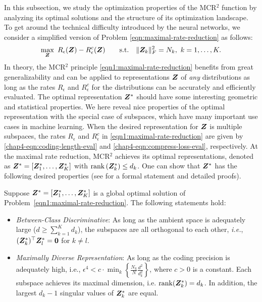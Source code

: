 \documentclass[../../book-main.tex]{subfiles}
\begin{document}
In this subsection, we study the optimization properties of the MCR$^2$ function by analyzing its optimal solutions and the structure of its optimization landscape. To get around the technical difficulty introduced by the neural networks, we consider a simplified version of Problem \eqref{eqn:maximal-rate-reduction} as follows: 
\begin{align}\label{eqn1:maximal-rate-reduction}
    \max_{\bm Z}\ R_{\epsilon}(\bm{Z}) - R_{\epsilon}^c(\bm{Z})\qquad \mathrm{s.t.}\quad \|\bm Z_k\|_F^2 = N_k,\ k =1,\dots,K. 
\end{align}
In theory, the MCR$^2$ principle \eqref{eqn1:maximal-rate-reduction} benefits from great generalizability and can be applied to representations $\bm{Z}$ of {\em any} distributions  as long as the rates $R_\epsilon$ and $R^c_\epsilon$ for the distributions can be accurately and efficiently evaluated. The optimal representation $\bm{Z}^{\ast}$  should have some interesting geometric and statistical properties. We here reveal nice properties of the optimal representation with the special case of subspaces, which have many important use cases in machine learning. When the desired representation for $\bm{Z}$ is multiple subspaces, the rates $R_\epsilon$ and $R^c_\epsilon$ in \eqref{eqn1:maximal-rate-reduction} are given by \eqref{chap4-eqn:coding-length-eval}
and \eqref{chap4-eqn:compress-loss-eval}, respectively. At the maximal rate reduction, MCR$^2$ achieves its optimal representations, denoted as $\bm{Z}^{\ast} = [\bm{Z}_1^*,\dots,\bm{Z}_K^*]$ with $\operatorname{rank}{(\bm{Z}_{k}^*)}\le d_k$. One can show that $\bm{Z}^{\ast}$ has the following desired properties (see \cite{yu2020learning} for a formal statement and detailed proofs).

\begin{theorem}
	Suppose $\bm{Z}^{\ast} = [\bm{Z}_1^*,\dots,\bm{Z}_K^*]$ is a global optimal solution of Problem~\eqref{eqn1:maximal-rate-reduction}. The following statements hold: 
	\begin{itemize}
		\item {\em Between-Class Discriminative}: As long as the ambient space is adequately large ($d \ge \sum_{k=1}^{K} d_k$), the subspaces are all orthogonal to each other, {\em i.e.}, $(\bm{Z}_{k}^*)^{\top} \bm{Z}_{l}^* = \bm{0}$ for $k \not= l$.
		\item {\em Maximally Diverse Representation}:
		      As long as the coding precision is adequately high, i.e., $\epsilon ^4 < c\cdot \min_{k}\left\{ \frac{N_k}{N}\frac{d^2}{d_k^2}\right\}$, where $c>0$ is a constant. Each subspace achieves its maximal dimension, i.e. $\mathrm{rank}{(\bm{Z}_{k}^*)}= d_k$. In addition, the largest $d_k-1$ singular values of $\bm{Z}_{k}^*$ are equal.
		      \label{thm:MCR2-properties}
	\end{itemize}
\end{theorem}
\end{document}
